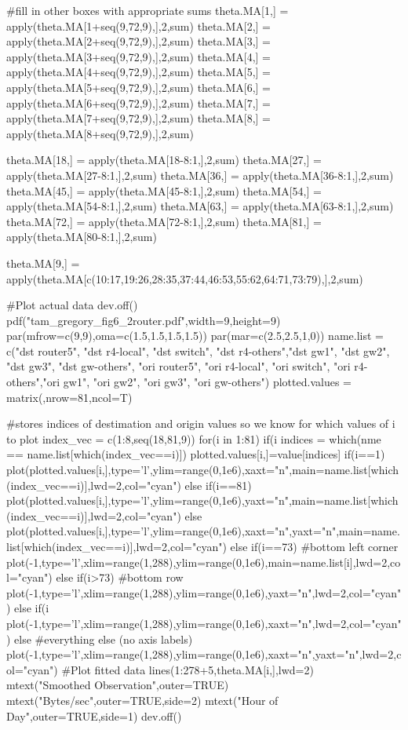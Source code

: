 \documentclass[letterpaper,10pt]{amsart}
\newenvironment{verbatimcode}{\bigskip \scriptsize \verbatim}{\endverbatim \normalsize \bigskip}
\begin{document}
\begin{enumerate}[{1}.1]
\begin{verbatimcode}
#fill in other boxes with appropriate sums
theta.MA[1,] = apply(theta.MA[1+seq(9,72,9),],2,sum)
theta.MA[2,] = apply(theta.MA[2+seq(9,72,9),],2,sum)
theta.MA[3,] = apply(theta.MA[3+seq(9,72,9),],2,sum)
theta.MA[4,] = apply(theta.MA[4+seq(9,72,9),],2,sum)
theta.MA[5,] = apply(theta.MA[5+seq(9,72,9),],2,sum)
theta.MA[6,] = apply(theta.MA[6+seq(9,72,9),],2,sum)
theta.MA[7,] = apply(theta.MA[7+seq(9,72,9),],2,sum)
theta.MA[8,] = apply(theta.MA[8+seq(9,72,9),],2,sum)

theta.MA[18,] = apply(theta.MA[18-8:1,],2,sum)
theta.MA[27,] = apply(theta.MA[27-8:1,],2,sum)
theta.MA[36,] = apply(theta.MA[36-8:1,],2,sum)
theta.MA[45,] = apply(theta.MA[45-8:1,],2,sum)
theta.MA[54,] = apply(theta.MA[54-8:1,],2,sum)
theta.MA[63,] = apply(theta.MA[63-8:1,],2,sum)
theta.MA[72,] = apply(theta.MA[72-8:1,],2,sum)
theta.MA[81,] = apply(theta.MA[80-8:1,],2,sum)

theta.MA[9,] = apply(theta.MA[c(10:17,19:26,28:35,37:44,46:53,55:62,64:71,73:79),],2,sum)


#Plot actual data
dev.off()
pdf("tam_gregory_fig6_2router.pdf",width=9,height=9)
par(mfrow=c(9,9),oma=c(1.5,1.5,1.5,1.5))
par(mar=c(2.5,2.5,1,0))
name.list = c("dst router5", "dst r4-local", "dst switch", "dst r4-others","dst gw1", "dst gw2", "dst gw3", "dst gw-others", 
              "ori router5", "ori r4-local", "ori switch", "ori r4-others","ori gw1", "ori gw2", "ori gw3", "ori gw-others")
plotted.values = matrix(,nrow=81,ncol=T)

#stores indices of destimation and origin values so we know for which values of i to plot
index_vec = c(1:8,seq(18,81,9))
for(i in 1:81)
{
  if(i %
  {
    indices = which(nme == name.list[which(index_vec==i)])
    plotted.values[i,]=value[indices]
    if(i==1)
    {
      plot(plotted.values[i,],type='l',ylim=range(0,1e6),xaxt="n",main=name.list[which(index_vec==i)],lwd=2,col="cyan")
    }else if(i==81)
    {
      plot(plotted.values[i,],type='l',ylim=range(0,1e6),yaxt="n",main=name.list[which(index_vec==i)],lwd=2,col="cyan")
    }else
    {
      plot(plotted.values[i,],type='l',ylim=range(0,1e6),xaxt="n",yaxt="n",main=name.list[which(index_vec==i)],lwd=2,col="cyan")
    }
  }else if(i==73) #bottom left corner
  {
    plot(-1,type='l',xlim=range(1,288),ylim=range(0,1e6),main=name.list[i],lwd=2,col="cyan")
  }else if(i>73) #bottom row
  {
    plot(-1,type='l',xlim=range(1,288),ylim=range(0,1e6),yaxt="n",lwd=2,col="cyan")
  }else if(i%
  {
    plot(-1,type='l',xlim=range(1,288),ylim=range(0,1e6),xaxt="n",lwd=2,col="cyan")
  }else #everything else (no axis labels)
  {
    plot(-1,type='l',xlim=range(1,288),ylim=range(0,1e6),xaxt="n",yaxt="n",lwd=2,col="cyan")
  }
  #Plot fitted data
  lines(1:278+5,theta.MA[i,],lwd=2)
}
mtext("Smoothed Observation",outer=TRUE)
mtext("Bytes/sec",outer=TRUE,side=2)
mtext("Hour of Day",outer=TRUE,side=1)
dev.off()
\end{verbatimcode}


\end{enumerate}
\end{document}

